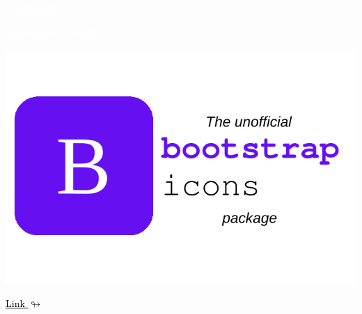 \documentclass{article}
\begin{document}
\thispagestyle{empty}


\begin{flushright}
\begin{tcolorbox}[leftrule=3mm,arc=0mm,width=4.5cm]
\begin{center}
{\Large\textcolor{white}{\it\bf VERSION 1}}
\end{center}
\end{tcolorbox}
\end{flushright}

\begin{flushright}
\begin{tcolorbox}[leftrule=3mm,arc=0mm,width=6.5cm]
\begin{center}
{\Large\textcolor{white}{\it\bf September 1, 2025}}
\end{center}
\end{tcolorbox}
\end{flushright}

\hspace{0pt}
\vfill
\begin{center}
\includegraphics[scale=1.0]{bootstrapicons_logo.pdf}
\end{center}\vspace{2mm}
\begin{center}
    \href{https://github.com/BenSt099/bootstrapicons}{\textcolor{black}{Link $\looparrowright$}}
\end{center}
\vfill
\hspace{0pt}
\newpage

\thispagestyle{empty}

\doublespacing
\tableofcontents
\singlespacing
\end{document}

